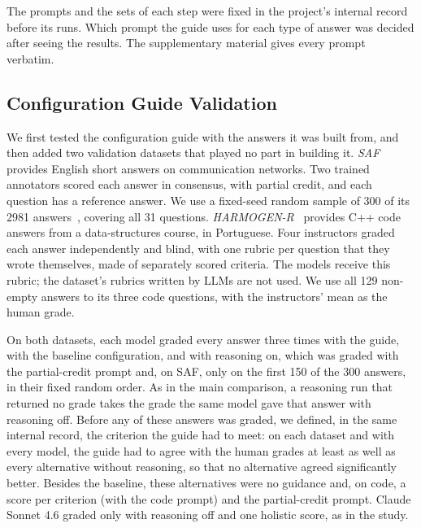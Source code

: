 The prompts and the sets of each step were fixed in the project's internal record before its runs. Which prompt
the guide uses for each type of answer was decided after seeing the results. The supplementary material gives every
prompt verbatim.

\subsection{Configuration Guide Validation}
\label{sec:validmethod}

We first tested the configuration guide with the answers it was built from, and then added two validation
datasets that played no part in building it. \emph{SAF}~\cite{filighera_saf_2022} provides English
short answers on communication networks. Two trained annotators scored each answer in consensus, with partial
credit, and each question has a reference answer. We use a fixed-seed random sample of 300 of its 2981
answers~\cite{saf_release_2022}, covering all 31 questions. \emph{HARMOGEN-R}~\cite{mendonca_harmogenr_2026}
provides C++ code answers from a data-structures course, in Portuguese. Four instructors graded each answer
independently and blind, with one rubric per question that they wrote themselves, made of separately scored
criteria. The models receive this rubric; the dataset's rubrics written by LLMs are not used. We use all 129
non-empty answers to its three code questions, with the instructors' mean as the human grade.

On both datasets, each model graded every answer three times with the guide, with the baseline configuration,
and with reasoning on, which was graded with the partial-credit prompt and, on SAF, only on the first 150 of the 300
answers, in their fixed random order. As in the main comparison, a reasoning run that returned no grade takes the
grade the same model gave that answer with reasoning off. Before any of these answers was graded, we defined, in the same internal record, the criterion the guide had to meet: on each dataset and with every model, the guide had to
agree with the human grades at least as well as every alternative without reasoning, so that no alternative agreed
significantly better. Besides the baseline, these alternatives were no guidance and, on code, a score per criterion
(with the code prompt) and the partial-credit prompt. Claude Sonnet 4.6 graded only with reasoning off and one
holistic score, as in the study.
